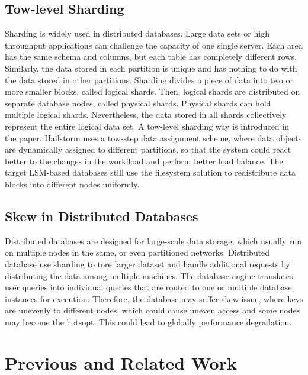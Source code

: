 \documentclass[a4paper,10pt,twoside]{article}
\begin{document}
\subsection{Tow-level Sharding}
Sharding is widely used in distributed databases. Large data sets or high throughput applications can challenge the capacity of one single server.
Each area has the same schema and columns, but each table has completely different rows. 
Similarly, the data stored in each partition is unique and has nothing to do with the data stored in other partitions.
Sharding divides a piece of data into two or more smaller blocks, called logical shards.
Then, logical shards are distributed on separate database nodes, called physical shards.
Physical shards can hold multiple logical shards. 
Nevertheless, the data stored in all shards collectively represent the entire logical data set.
\newline
A tow-level sharding way is introduced in the paper\cite{mainpaper}. 
Hailstorm uses a tow-step data assignment scheme, where data objects are dynamically assigned to different partitions, 
so that the system could react better to the changes in the workfload and perform better load balance.
The target LSM-based databases still use the filesystem solution to redistribute data blocks into different nodes uniformly.


\subsection{Skew in Distributed Databases}

Distributed databases \cite{mongodb,tidb} are designed for large-scale data storage, which usually run on multiple nodes in the same,
or even partitioned networks.
Distributed database use sharding to tore larger dataset and handle additional requests by distributing the data among multiple machines.
The database engine translates user queries into individual queries that are routed to one or multiple database instances for execution.
Therefore, the database may suffer skew issue, where keys are unevenly to different nodes, which could cause uneven access and some nodes may become the hotsopt.
This could lead to globally performance degradation.



\section{Previous and Related Work}
\end{document}
